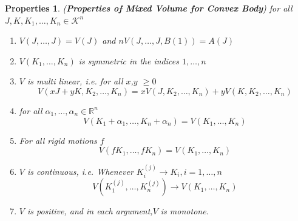 \documentclass[oneside]{book}
\newtheorem{properties}{Properties}[section]
\begin{document}
	\begin{properties} (\textbf{Properties of Mixed Volume for Convex Body})
		\label{prop :2}
		for all $J, K, K_{1}, \ldots, K_{n} 
		\in \mathcal{K}^{n}$ \\ 
		\begin{enumerate}
			
			\item
			$V(J, \ldots, J)=V(J)$ and $ nV(J, \ldots, J, B(1))=A(J)$ 
			
			\item 
			$V\left(K_{1}, \ldots, K_{n}\right)$ is symmetric in the indices $1,\ldots, n$
			\item
			$V$ is multi linear, i.e.
			for all $ x$,$y$ $\geq 0 $
			$$
			V\left(x J+y K, K_{2}, \ldots, K_{n}\right)=x V\left(J, K_{2}, \ldots, K_{n}\right)+y V\left(K, K_{2}, \ldots, K_{n}\right)
			$$
			\item
			for all $\alpha_{1}, \ldots, \alpha_{n} \in \mathbb{R}^{n}$
			$$
			V\left(K_{1}+\alpha_{1}, \ldots, K_{n}+\alpha_{n}\right)=V\left(K_{1}, \ldots, K_{n}\right)
			$$
			\item  
			For all rigid motions $f$ 
			$$ 
			V\left(f K_{1}, \ldots, f K_{n}\right)=V\left(K_{1}, \ldots, K_{n}\right)
			$$ 
			\item
			$V$ is continuous, i.e.
			Whenever $K_{i}^{(j)} \rightarrow K_{i}, i=1, \ldots, n$
			\[
			V\left(K_{1}^{(j)}, \ldots, K_{n}^{(j)}\right) \rightarrow V\left(K_{1}, \ldots, K_{n}\right)
			\]
			\item $V$ is positive, and in each argument,$V$ is monotone.     
			
		\end{enumerate}
	\end{properties}
	
\end{document}
